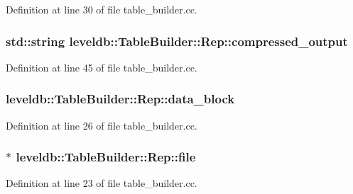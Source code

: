 Definition at line 30 of file table\+\_\+builder.\+cc.

\hypertarget{structleveldb_1_1_table_builder_1_1_rep_ae299e513afc71a8474c303b25aaadb08}{}
\subsubsection[{compressed\+\_\+output}]{\setlength{\rightskip}{0pt plus 5cm}std\+::string leveldb\+::\+Table\+Builder\+::\+Rep\+::compressed\+\_\+output}\label{structleveldb_1_1_table_builder_1_1_rep_ae299e513afc71a8474c303b25aaadb08}


Definition at line 45 of file table\+\_\+builder.\+cc.

\hypertarget{structleveldb_1_1_table_builder_1_1_rep_a6bef8b1271d88ec2d38aa7a0f9ae8a24}{}
\subsubsection[{data\+\_\+block}]{ leveldb\+::\+Table\+Builder\+::\+Rep\+::data\+\_\+block}\label{structleveldb_1_1_table_builder_1_1_rep_a6bef8b1271d88ec2d38aa7a0f9ae8a24}


Definition at line 26 of file table\+\_\+builder.\+cc.

\hypertarget{structleveldb_1_1_table_builder_1_1_rep_a3c33014db181b382785784cf0864f92b}{}
\subsubsection[{file}]{$\ast$ leveldb\+::\+Table\+Builder\+::\+Rep\+::file}\label{structleveldb_1_1_table_builder_1_1_rep_a3c33014db181b382785784cf0864f92b}


Definition at line 23 of file table\+\_\+builder.\+cc.

